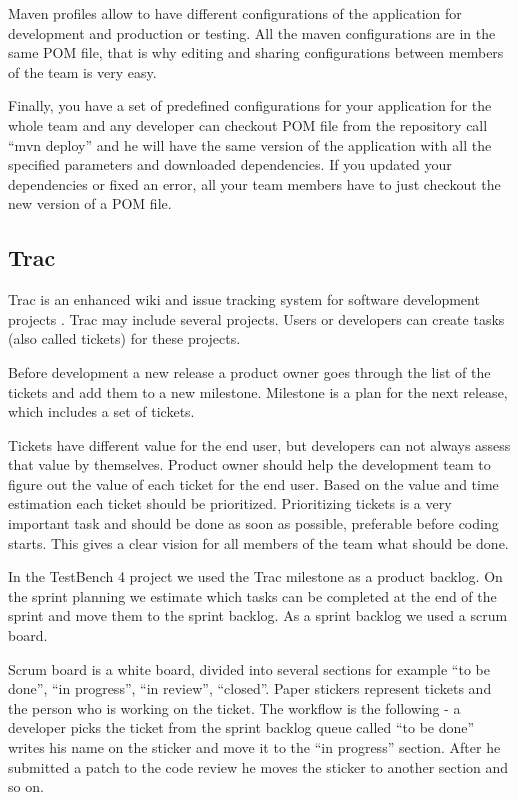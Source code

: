    Maven profiles allow to have different configurations of the
  application for development and production or testing. All the maven
  configurations are in the same POM file, that is why editing and sharing
  configurations between members of the team is very easy. 

  Finally, you have a set of predefined configurations for your application
  for the whole team and any developer can checkout POM file from the repository
  call ``mvn deploy'' and he will have the same version of the application with all
  the specified parameters and downloaded dependencies. If you updated
  your dependencies or fixed an error, all your team members
  have to just checkout the new version of a POM file.
 
  \subsection{Trac}
  Trac is an enhanced wiki and issue tracking system for software development
  projects \cite{trac}. Trac may include several projects. Users or developers
  can create tasks (also called tickets) for these projects. 
  
   Before development a new release a product owner goes through 
   the list of the tickets and add them to a new milestone.
  Milestone is a plan for the next release, which includes a set of tickets.

  Tickets have different value for the end user, but developers can not always
  assess that value by themselves. Product owner should help the development team
   to figure out the
  value of each ticket for the end user. Based on the value and time estimation
   each ticket should be prioritized.
  Prioritizing tickets is a very important task and should be done as soon as
  possible, preferable before coding starts. This gives a clear vision for all
  members of the team what should be done.

  In the TestBench 4 project we used the Trac milestone as a product backlog. On
  the sprint planning we estimate which tasks can be completed at the end of the sprint 
  and move them to the sprint backlog. As a sprint backlog we used a scrum
  board.
  
  Scrum board is a white board, divided into several sections for example ``to be done'', ``in progress'', 
  ``in review'',
  ``closed''. Paper stickers represent tickets and the person who is working on
  the ticket.  
  The workflow is the following - a developer picks the
  ticket from the sprint backlog queue called ``to be done'' 
  writes his name on the sticker and move it to the ``in progress'' section.
  After he submitted a patch to the code review he moves the sticker to another
  section and so on.
  
